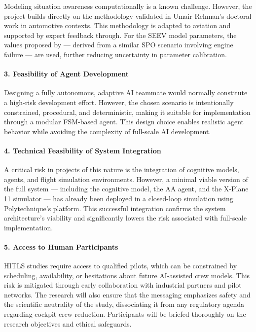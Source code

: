 \documentclass[12pt,a4paper]{article} %
\begin{document}
	Modeling situation awareness computationally is a known challenge. However, the project builds directly on the methodology validated in Umair Rehman's doctoral work in automotive contexts. This methodology is adapted to aviation and supported by expert feedback through. For the SEEV model parameters, the values proposed by \parencite{wang_real-time_2024} — derived from a similar SPO scenario involving engine failure — are used, further reducing uncertainty in parameter calibration.

	\paragraph{3. Feasibility of Agent Development}

	Designing a fully autonomous, adaptive AI teammate would normally constitute a high-risk development effort. However, the chosen scenario is intentionally constrained, procedural, and deterministic, making it suitable for implementation through a modular FSM-based agent. This design choice enables realistic agent behavior while avoiding the complexity of full-scale AI development.

	\paragraph{4. Technical Feasibility of System Integration}

	A critical risk in projects of this nature is the integration of cognitive models, agents, and flight simulation environments. However, a minimal viable version of the full system — including the cognitive model, the AA agent, and the X-Plane 11 simulator — has already been deployed in a closed-loop simulation using Polytechnique's platform. This successful integration confirms the system architecture's viability and significantly lowers the risk associated with full-scale implementation.

	\paragraph{5. Access to Human Participants}

	HITLS studies require access to qualified pilots, which can be constrained by scheduling, availability, or hesitations about future AI-assisted crew models. This risk is mitigated through early collaboration with industrial partners and pilot networks. The research will also ensure that the messaging emphasizes safety and the scientific neutrality of the study, dissociating it from any regulatory agenda regarding cockpit crew reduction. Participants will be briefed thoroughly on the research objectives and ethical safeguards.
\end{document}
